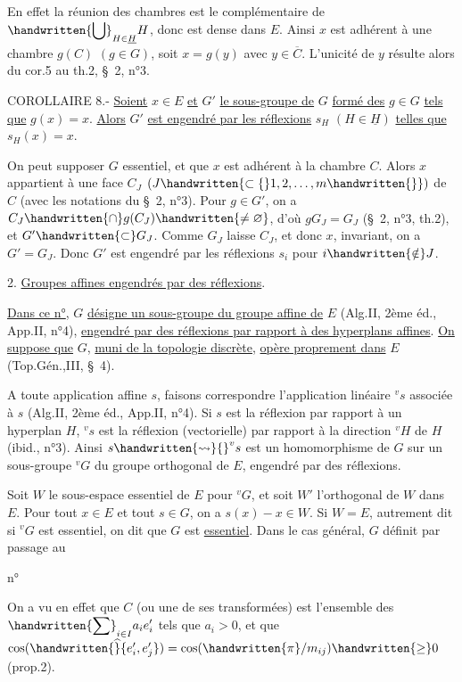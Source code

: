 En effet la réunion des chambres est le complémentaire de $\displaystyle\handwritten{\bigcup}_{H\in\underline{H}}H$, donc est dense dans $E$. Ainsi $x$ est adhérent à une chambre $g(C)$ $(g\in G)$, soit $x=g(y)$ avec $y\in\overline{C}$. L'unicité de $y$ résulte alors du cor.5 au th.2, \S\ 2, n°3.

COROLLAIRE 8.- \uline{Soient} $x\in E$ \uline{et} $G'$ \uline{le sous-groupe de} $G$ \uline{formé des} $g\in G$ \uline{tels que} $g(x)=x$. \uline{Alors} $G'$ \uline{est engendré par les réflexions} $s_H$ $(H\in\underline{H})$ \uline{telles que} $s_H(x)=x$.

On peut supposer $G$ essentiel, et que $x$ est adhérent à la chambre $C$. Alors $x$ appartient à une face $C_J$ $(J\handwritten{\subset\{}1,2,\ldots,m\handwritten{\}})$ de $C$ (avec les notations du \S\ 2, n°3). Pour $g\in G'$, on a $C_J\handwritten{\cap}g(C_J)\handwritten{\ne\varnothing}$, d'où $gG_J=G_J$ (\S\ 2, n°3, th.2), et $G'\handwritten{\subset}G_J$. Comme $G_J$ laisse $C_J$, et donc $x$, invariant, on a $G'=G_J$. Donc $G'$ est engendré par les réflexions $s_i$ pour $i\handwritten{\notin}J$.

2. \uline{Groupes affines engendrés par des réflexions}.

\uline{Dans ce n°}, $G$ \uline{désigne un sous-groupe du groupe affine de} $E$ (Alg.II, 2ème éd., App.II, n°4), \uline{engendré par des réflexions par rapport à des hyperplans affines}. \uline{On suppose que} $G$, \uline{muni de la topologie discrète}, \uline{opère proprement dans} $E$ (Top.Gén.,III, \S\ 4).

A toute application affine $s$, faisons correspondre l'application linéaire ${}^vs$ associée à $s$ (Alg.II, 2ème éd., App.II, n°4). Si $s$ est la réflexion par rapport à un hyperplan $H$, ${}^vs$ est la réflexion (vectorielle) par rapport à la direction ${}^vH$ de $H$ (ibid., n°3). Ainsi $s\handwritten{\rightsquigarrow}{}^vs$ est un homomorphisme de $G$ sur un sous-groupe ${}^vG$ du groupe orthogonal de $E$, engendré par des réflexions.

Soit $W$ le sous-espace essentiel de $E$ pour ${}^vG$, et soit $W'$ l'orthogonal de $W$ dans $E$. Pour tout $x\in E$ et tout $s\in G$, on a $s(x)-x\in W$. Si $W=E$, autrement dit si ${}^vG$ est essentiel, on dit que $G$ est \uline{essentiel}. Dans le cas général, $G$ définit par passage au
\begin{flushright}n°\end{flushright}
On a vu en effet que $C$ (ou une de ses transformées) est l'ensemble des $\displaystyle\handwritten{\sum}_{i\in I}a_i e'_i$ tels que $a_i>0$, et que $\cos(\handwritten{\widehat}{e'_i,e'_j})=\cos(\handwritten{\pi}/m_{ij})\handwritten{\geq}0$ (prop.2).

